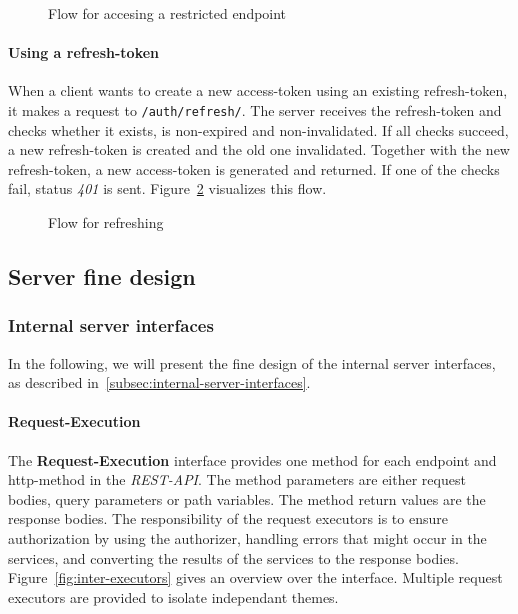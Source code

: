 \begin{figure}
    \centering

    \caption{Flow for accesing a restricted endpoint}
    \label{fig:using-access-token}
\end{figure}

\paragraph{Using a refresh-token}
When a client wants to create a new access-token using an existing refresh-token, it makes a request to \texttt{/auth/refresh/}.
The server receives the refresh-token and checks whether it exists, is non-expired and non-invalidated.
If all checks succeed, a new refresh-token is created and the old one invalidated.
Together with the new refresh-token, a new access-token is generated and returned.
If one of the checks fail, status \textit{401} is sent. \newline
Figure~\ref{fig:using-refresh-token} visualizes this flow.

\begin{figure}
    \centering

    \caption{Flow for refreshing}
    \label{fig:using-refresh-token}
\end{figure}

\subsection{Server fine design}\label{subsec:server-fine-design}

\subsubsection{Internal server interfaces}
In the following, we will present the fine design of the internal server interfaces, as described in~\ref{subsec:internal-server-interfaces}.

\paragraph{Request-Execution}
The \textbf{Request-Execution} interface provides one method for each endpoint and http-method in the \textit{REST-API}.
The method parameters are either request bodies, query parameters or path variables.
The method return values are the response bodies.\newline
The responsibility of the request executors is to ensure authorization by using the authorizer, handling errors that might occur in the services, and converting the results of the services to the response bodies.
Figure~\ref{fig:inter-executors} gives an overview over the interface.
Multiple request executors are provided to isolate independant themes.

